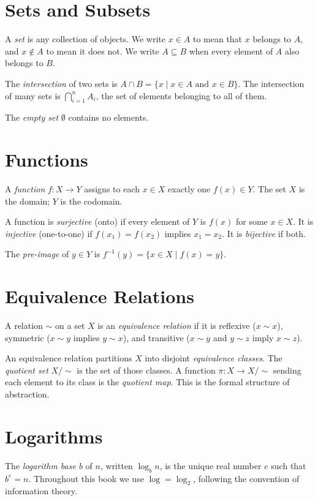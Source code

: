 \documentclass[11pt]{book}
\theoremstyle{plain}
\theoremstyle{definition}
\theoremstyle{remark}
\begin{document}
\section*{Sets and Subsets}

A \emph{set} is any collection of objects. We write $x \in A$ to mean
that $x$ belongs to $A$, and $x \notin A$ to mean it does not. We write
$A \subseteq B$ when every element of $A$ also belongs to $B$.

The \emph{intersection} of two sets is
$A \cap B = \{x \mid x \in A \text{ and } x \in B\}$.
The intersection of many sets is $\bigcap_{i=1}^n A_i$, the set of
elements belonging to all of them.

The \emph{empty set} $\emptyset$ contains no elements.

\section*{Functions}

A \emph{function} $f : X \to Y$ assigns to each $x \in X$ exactly one
$f(x) \in Y$. The set $X$ is the domain; $Y$ is the codomain.

A function is \emph{surjective} (onto) if every element of $Y$ is
$f(x)$ for some $x \in X$. It is \emph{injective} (one-to-one) if
$f(x_1) = f(x_2)$ implies $x_1 = x_2$. It is \emph{bijective} if
both.

The \emph{pre-image} of $y \in Y$ is $f^{-1}(y) = \{x \in X \mid
f(x) = y\}$.

\section*{Equivalence Relations}

A relation $\sim$ on a set $X$ is an \emph{equivalence relation} if it
is reflexive ($x \sim x$), symmetric ($x \sim y$ implies $y \sim x$),
and transitive ($x \sim y$ and $y \sim z$ imply $x \sim z$).

An equivalence relation partitions $X$ into disjoint \emph{equivalence
classes}. The \emph{quotient set} $X / {\sim}$ is the set of those
classes. A function $\pi : X \to X/{\sim}$ sending each element to its
class is the \emph{quotient map}. This is the formal structure of
abstraction.

\section*{Logarithms}

The \emph{logarithm base $b$} of $n$, written $\log_b n$, is the
unique real number $e$ such that $b^e = n$. Throughout this book we
use $\log = \log_2$, following the convention of information theory.
\end{document}
